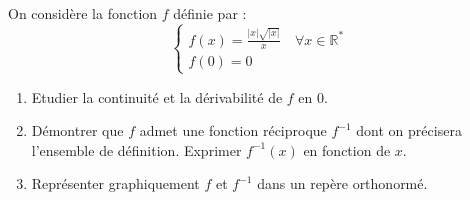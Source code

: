       \begin{exo}
            On consid\`ere la fonction $f$ d\'efinie par :
                  \[
                        \left\lbrace
                              \begin{array}{l}
                                    f(x) = \frac{|x| \sqrt{|x|}}{x} \quad \forall x \in \mathbb{R}^*\\
                                    f(0) = 0
                              \end{array}
                        \right.
                  \]
            \begin{enumerate}
                  \item Etudier la continuit\'e et la d\'erivabilit\'e de $f$ en $0$.
                  \item D\'emontrer que $f$ admet une fonction r\'eciproque $f^{-1}$ 
                        dont on pr\'ecisera l'ensemble de d\'efinition.
                        Exprimer $f^{-1} (x)$ en fonction de $x$.
                  \item Repr\'esenter graphiquement $f$ et $f^{-1}$ dans un rep\`ere orthonorm\'e.
            \end{enumerate}
      \end{exo}
%
